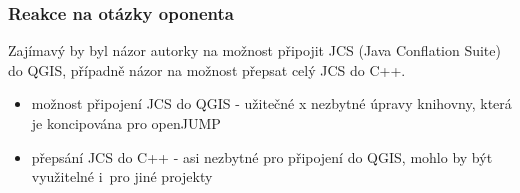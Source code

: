 \documentclass[unicode,bookmarksnumbered]{beamer}
\begin{document}
 \begin{frame}
  \frametitle{Reakce na otázky oponenta}
Zajímavý by byl názor autorky na možnost připojit JCS (Java Conflation Suite) do 
QGIS, případně názor na možnost přepsat celý JCS do C++.
      \begin{itemize}
       \item možnost připojení JCS do QGIS - užitečné x nezbytné úpravy knihovny, která je koncipována pro openJUMP
       \item přepsání JCS do C++ - asi nezbytné pro připojení do QGIS, mohlo by být využitelné i~pro jiné projekty
      \end{itemize}
 \end{frame}


\end{document}
